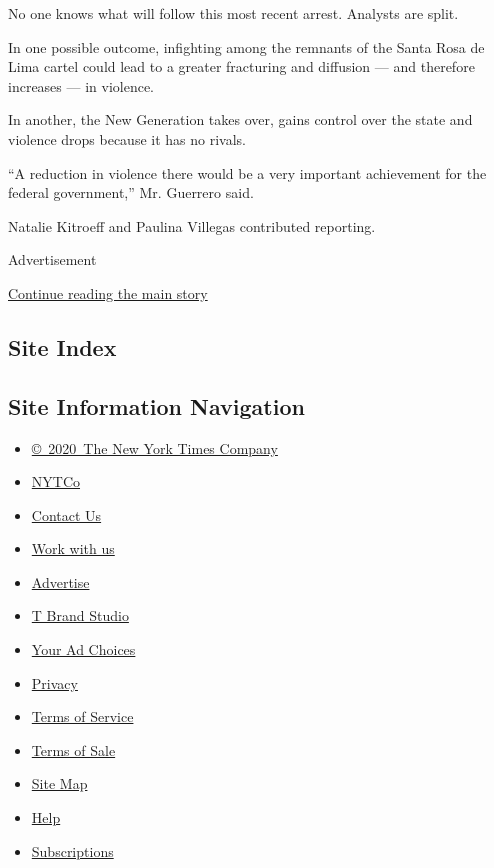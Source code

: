 No one knows what will follow this most recent arrest. Analysts are
split.

In one possible outcome, infighting among the remnants of the Santa Rosa
de Lima cartel could lead to a greater fracturing and diffusion --- and
therefore increases --- in violence.

In another, the New Generation takes over, gains control over the state
and violence drops because it has no rivals.

``A reduction in violence there would be a very important achievement
for the federal government,'' Mr. Guerrero said.

Natalie Kitroeff and Paulina Villegas contributed reporting.

Advertisement

\protect\hyperlink{after-bottom}{Continue reading the main story}

\hypertarget{site-index}{%
\subsection{Site Index}\label{site-index}}

\hypertarget{site-information-navigation}{%
\subsection{Site Information
Navigation}\label{site-information-navigation}}

\begin{itemize}
\tightlist
\item
  \href{https://help.nytimes.com/hc/en-us/articles/115014792127-Copyright-notice}{©~2020~The
  New York Times Company}
\end{itemize}

\begin{itemize}
\tightlist
\item
  \href{https://www.nytco.com/}{NYTCo}
\item
  \href{https://help.nytimes.com/hc/en-us/articles/115015385887-Contact-Us}{Contact
  Us}
\item
  \href{https://www.nytco.com/careers/}{Work with us}
\item
  \href{https://nytmediakit.com/}{Advertise}
\item
  \href{http://www.tbrandstudio.com/}{T Brand Studio}
\item
  \href{https://www.nytimes.com/privacy/cookie-policy\#how-do-i-manage-trackers}{Your
  Ad Choices}
\item
  \href{https://www.nytimes.com/privacy}{Privacy}
\item
  \href{https://help.nytimes.com/hc/en-us/articles/115014893428-Terms-of-service}{Terms
  of Service}
\item
  \href{https://help.nytimes.com/hc/en-us/articles/115014893968-Terms-of-sale}{Terms
  of Sale}
\item
  \href{https://spiderbites.nytimes.com}{Site Map}
\item
  \href{https://help.nytimes.com/hc/en-us}{Help}
\item
  \href{https://www.nytimes.com/subscription?campaignId=37WXW}{Subscriptions}
\end{itemize}
